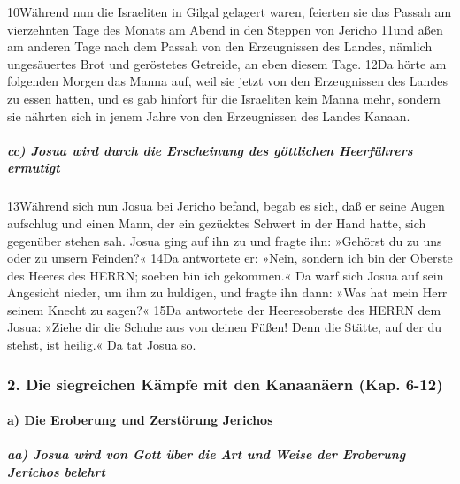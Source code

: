 10Während nun die Israeliten in Gilgal gelagert waren, feierten sie das
Passah am vierzehnten Tage des Monats am Abend in den Steppen von
Jericho 11und aßen am anderen Tage nach dem Passah von den Erzeugnissen
des Landes, nämlich ungesäuertes Brot und geröstetes Getreide, an eben
diesem Tage. 12Da hörte am folgenden Morgen das Manna auf, weil sie
jetzt von den Erzeugnissen des Landes zu essen hatten, und es gab
hinfort für die Israeliten kein Manna mehr, sondern sie nährten sich in
jenem Jahre von den Erzeugnissen des Landes Kanaan.

\hypertarget{cc-josua-wird-durch-die-erscheinung-des-guxf6ttlichen-heerfuxfchrers-ermutigt}{%
\subparagraph{cc) Josua wird durch die Erscheinung des göttlichen
Heerführers
ermutigt}\label{cc-josua-wird-durch-die-erscheinung-des-guxf6ttlichen-heerfuxfchrers-ermutigt}}

13Während sich nun Josua bei Jericho befand, begab es sich, daß er seine
Augen aufschlug und einen Mann, der ein gezücktes Schwert in der Hand
hatte, sich gegenüber stehen sah. Josua ging auf ihn zu und fragte ihn:
»Gehörst du zu uns oder zu unsern Feinden?« 14Da antwortete er: »Nein,
sondern ich bin der Oberste des Heeres des HERRN; soeben bin ich
gekommen.« Da warf sich Josua auf sein Angesicht nieder, um ihm zu
huldigen, und fragte ihn dann: »Was hat mein Herr seinem Knecht zu
sagen?« 15Da antwortete der Heeresoberste des HERRN dem Josua: »Ziehe
dir die Schuhe aus von deinen Füßen! Denn die Stätte, auf der du stehst,
ist heilig.« Da tat Josua so.

\hypertarget{die-siegreichen-kuxe4mpfe-mit-den-kanaanuxe4ern-kap.-6-12}{%
\subsubsection{2. Die siegreichen Kämpfe mit den Kanaanäern (Kap.
6-12)}\label{die-siegreichen-kuxe4mpfe-mit-den-kanaanuxe4ern-kap.-6-12}}

\hypertarget{a-die-eroberung-und-zerstuxf6rung-jerichos}{%
\paragraph{a) Die Eroberung und Zerstörung
Jerichos}\label{a-die-eroberung-und-zerstuxf6rung-jerichos}}

\hypertarget{aa-josua-wird-von-gott-uxfcber-die-art-und-weise-der-eroberung-jerichos-belehrt}{%
\subparagraph{aa) Josua wird von Gott über die Art und Weise der
Eroberung Jerichos
belehrt}\label{aa-josua-wird-von-gott-uxfcber-die-art-und-weise-der-eroberung-jerichos-belehrt}}

